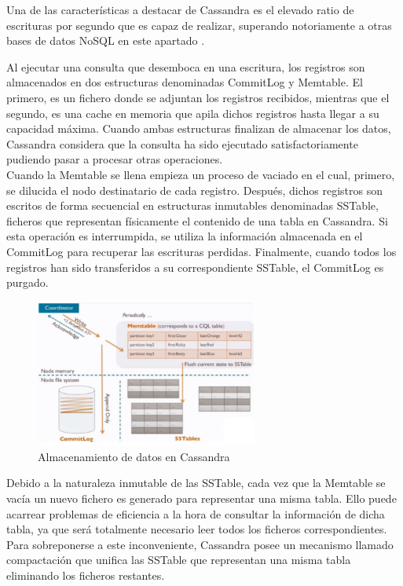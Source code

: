 Una de las características a destacar de Cassandra es el elevado ratio de escrituras por segundo que es capaz de realizar, superando notoriamente a otras bases de datos NoSQL en este apartado \cite{rabl2012solving}.

Al ejecutar una consulta que desemboca en una escritura, los registros son almacenados en dos estructuras denominadas CommitLog y Memtable. El primero, es un fichero donde se adjuntan los registros recibidos, mientras que el segundo, es una cache en memoria que apila dichos registros hasta llegar a su capacidad máxima. Cuando ambas estructuras finalizan de almacenar los datos, Cassandra considera que la consulta ha sido ejecutado satisfactoriamente pudiendo pasar a procesar otras operaciones.\\

Cuando la Memtable se llena empieza un proceso de vaciado en el cual, primero, se dilucida el nodo destinatario de cada registro. Después, dichos registros son escritos de forma secuencial en estructuras inmutables denominadas SSTable, ficheros que representan físicamente el contenido de una tabla en Cassandra. Si esta operación es interrumpida, se utiliza la información almacenada en el CommitLog para recuperar las escrituras perdidas. Finalmente, cuando todos los registros han sido transferidos a su correspondiente SSTable, el CommitLog es purgado.\\

\begin{figure}[h]
	\centering
	\includegraphics[width=0.65\textwidth]{Ilustraciones/cassandra_data_storage.png}
	\caption{Almacenamiento de datos en Cassandra}
	\label{fig:almacenamiento_cassandra}
\end{figure}

Debido a la naturaleza inmutable de las SSTable, cada vez que la Memtable se vacía un nuevo fichero es generado para representar una misma tabla. Ello puede acarrear problemas de eficiencia a la hora de consultar la información de dicha tabla, ya que será totalmente necesario leer todos los ficheros correspondientes. Para sobreponerse a este inconveniente, Cassandra posee un mecanismo llamado compactación que unifica las SSTable que representan una misma tabla eliminando los ficheros restantes.\\


